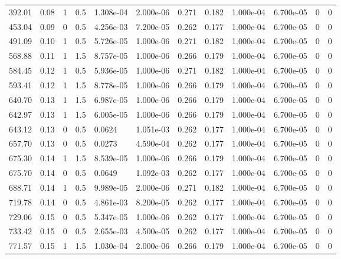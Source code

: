 \documentclass[preview]{standalone}
\begin{document}
{{\begin{tabular}{L{1.2cm}C{1.2cm} C{0.3cm}C{0.5cm} C{1.4cm}C{1.4cm} C{1.4cm}C{1.4cm} C{1.6cm}C{1.6cm} C{1.6cm}C{1.6cm}}
  392.01  &  0.08  & 1     & 0.5 &  1.308e-04  & 2.000e-06  &  0.271&   0.182& 1.000e-04 & 6.700e-05   &  0 & 0  \\ 
  453.04  &  0.09  & 0     & 0.5 &  4.256e-03  & 7.200e-05  &  0.262&   0.177& 1.000e-04 & 6.700e-05   &  0 & 0  \\ 
  491.09  &  0.10  & 1     & 0.5 &  5.726e-05  & 1.000e-06  &  0.271&   0.182& 1.000e-04 & 6.700e-05   &  0 & 0  \\ 
  568.88  &  0.11  & 1     & 1.5 &  8.757e-05  & 1.000e-06  &  0.266&   0.179& 1.000e-04 & 6.700e-05   &  0 & 0  \\ 
  584.45  &  0.12  & 1     & 0.5 &  5.936e-05  & 1.000e-06  &  0.271&   0.182& 1.000e-04 & 6.700e-05   &  0 & 0  \\ 
  593.41  &  0.12  & 1     & 1.5 &  8.778e-05  & 1.000e-06  &  0.266&   0.179& 1.000e-04 & 6.700e-05   &  0 & 0  \\ 
  640.70  &  0.13  & 1     & 1.5 &  6.987e-05  & 1.000e-06  &  0.266&   0.179& 1.000e-04 & 6.700e-05   &  0 & 0  \\ 
  642.97  &  0.13  & 1     & 1.5 &  6.005e-05  & 1.000e-06  &  0.266&   0.179& 1.000e-04 & 6.700e-05   &  0 & 0  \\ 
  643.12  &  0.13  & 0     & 0.5 &  0.0624  & 1.051e-03  &  0.262&   0.177& 1.000e-04 & 6.700e-05   &  0 & 0  \\ 
  657.70  &  0.13  & 0     & 0.5 &  0.0273  & 4.590e-04  &  0.262&   0.177& 1.000e-04 & 6.700e-05   &  0 & 0  \\ 
  675.30  &  0.14  & 1     & 1.5 &  8.539e-05  & 1.000e-06  &  0.266&   0.179& 1.000e-04 & 6.700e-05   &  0 & 0  \\ 
  675.70  &  0.14  & 0     & 0.5 &  0.0649  & 1.092e-03  &  0.262&   0.177& 1.000e-04 & 6.700e-05   &  0 & 0  \\ 
  688.71  &  0.14  & 1     & 0.5 &  9.989e-05  & 2.000e-06  &  0.271&   0.182& 1.000e-04 & 6.700e-05   &  0 & 0  \\ 
  719.78  &  0.14  & 0     & 0.5 &  4.861e-03  & 8.200e-05  &  0.262&   0.177& 1.000e-04 & 6.700e-05   &  0 & 0  \\ 
  729.06  &  0.15  & 0     & 0.5 &  5.347e-05  & 1.000e-06  &  0.262&   0.177& 1.000e-04 & 6.700e-05   &  0 & 0  \\ 
  733.42  &  0.15  & 0     & 0.5 &  2.655e-03  & 4.500e-05  &  0.262&   0.177& 1.000e-04 & 6.700e-05   &  0 & 0  \\ 
  771.57  &  0.15  & 1     & 1.5 &  1.030e-04  & 2.000e-06  &  0.266&   0.179& 1.000e-04 & 6.700e-05   &  0 & 0  \\ 

\end{tabular}}}
\end{document}
